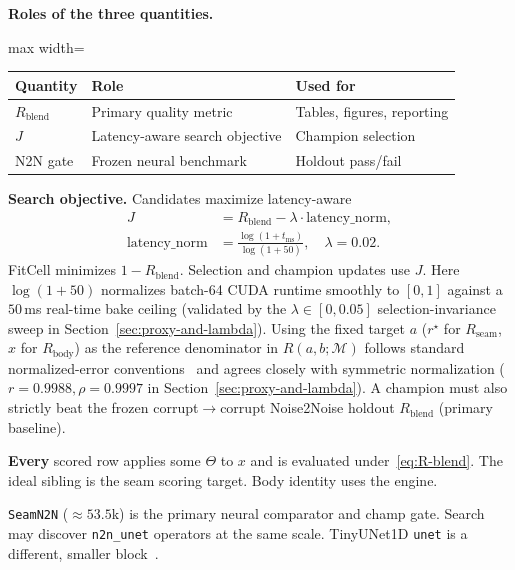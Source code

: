 \textbf{Roles of the three quantities.}
\begin{center}
\small
\begin{adjustbox}{max width=\columnwidth}
\begin{tabular}{@{}lll@{}}
\toprule
Quantity & Role & Used for \\
\midrule
$R_{\mathrm{blend}}$ & Primary quality metric & Tables, figures, reporting \\
$J$ & Latency-aware search objective & Champion selection \\
N2N gate & Frozen neural benchmark & Holdout pass/fail \\
\bottomrule
\end{tabular}
\end{adjustbox}
\end{center}

\textbf{Search objective.}
Candidates maximize latency-aware
\begin{equation}
\label{eq:outer-obj}
\begin{aligned}
J&=R_{\mathrm{blend}}-\lambda\cdot\mathrm{latency\_norm},\\
\mathrm{latency\_norm}
&=\frac{\log(1+t_{\mathrm{ms}})}{\log(1+50)},
\quad \lambda=0.02.
\end{aligned}
\end{equation}
FitCell minimizes $1-R_{\mathrm{blend}}$. Selection and champion updates use $J$.
Here $\log(1+50)$ normalizes batch-64 CUDA runtime smoothly to $[0,1]$ against a $50$\,ms real-time bake ceiling (validated by the $\lambda\in[0,0.05]$ selection-invariance sweep in Section~\ref{sec:proxy-and-lambda}).
Using the fixed target $a$ ($r^{\star}$ for $R_{\mathrm{seam}}$, $x$ for $R_{\mathrm{body}}$) as the reference denominator in $R(a,b;\mathcal{M})$ follows standard normalized-error conventions~\cite{purwins2019} and agrees closely with symmetric normalization ($r{=}0.9988, \rho{=}0.9997$ in Section~\ref{sec:proxy-and-lambda}).
A champion must also strictly beat the frozen corrupt$\to$corrupt Noise2Noise holdout $R_{\mathrm{blend}}$ (primary baseline).

\textbf{Every} scored row applies some $\Theta$ to $x$ and is evaluated under~\eqref{eq:R-blend}.
The ideal sibling is the seam scoring target. Body identity uses the engine.

\begin{remark}
\label{rem:n2n}
\texttt{SeamN2N} (${\approx}53.5$k) is the primary neural comparator and champ gate.
Search may discover \texttt{n2n\_unet} operators at the same scale. TinyUNet1D \texttt{unet} is a different, smaller block~\cite{lehtinen2018,kashyap2021n2n}.
\end{remark}


